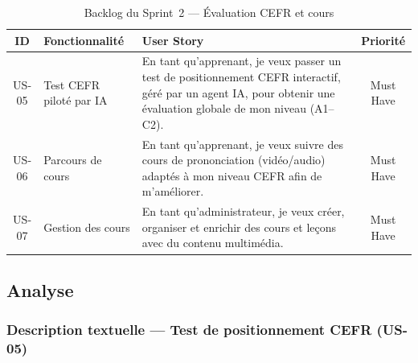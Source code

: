 \begin{table}[H]
\centering
\small
\renewcommand{\arraystretch}{1.3}
\begin{tabular}{|c|p{2.8cm}|p{7.5cm}|c|}
\hline
\rowcolor[gray]{0.88}
\textbf{ID} & \textbf{Fonctionnalité} & \textbf{User Story} & \textbf{Priorité} \\
\hline
US-05 & Test CEFR piloté par IA &
    En tant qu'apprenant, je veux passer un test de positionnement CEFR interactif, 
    géré par un agent IA, pour obtenir une évaluation globale de mon niveau (A1--C2). & Must Have \\
\hline
US-06 & Parcours de cours &
    En tant qu'apprenant, je veux suivre des cours de prononciation (vidéo/audio) 
    adaptés à mon niveau CEFR afin de m'améliorer. & Must Have \\
\hline
US-07 & Gestion des cours &
    En tant qu'administrateur, je veux créer, organiser et enrichir des cours et leçons 
    avec du contenu multimédia. & Must Have \\
\hline
\end{tabular}
\caption{Backlog du Sprint~2 --- Évaluation CEFR et cours}
\label{tab:backlog-sprint2}
\end{table}

\subsection{Analyse}

\subsubsection{Description textuelle --- Test de positionnement CEFR (US-05)}

